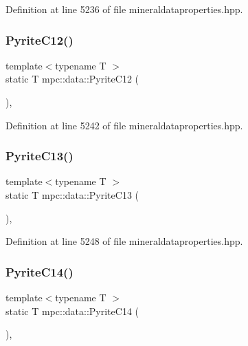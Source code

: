 Definition at line 5236 of file mineraldataproperties.\+hpp.

\mbox{\label{namespacempc_1_1data_aade0b397c9aac7f443182fa1fcf7a081}} 
\subsubsection{\texorpdfstring{Pyrite\+C12()}{PyriteC12()}}
{\footnotesize\ttfamily template$<$typename T $>$ \\
static T mpc\+::data\+::\+Pyrite\+C12 (\begin{DoxyParamCaption}{ }\end{DoxyParamCaption})\hspace{0.3cm}{\ttfamily [inline]}, {\ttfamily [static]}}



Definition at line 5242 of file mineraldataproperties.\+hpp.

\mbox{\label{namespacempc_1_1data_add506a3d279a43e1163ae3dbb77a40f4}} 
\subsubsection{\texorpdfstring{Pyrite\+C13()}{PyriteC13()}}
{\footnotesize\ttfamily template$<$typename T $>$ \\
static T mpc\+::data\+::\+Pyrite\+C13 (\begin{DoxyParamCaption}{ }\end{DoxyParamCaption})\hspace{0.3cm}{\ttfamily [inline]}, {\ttfamily [static]}}



Definition at line 5248 of file mineraldataproperties.\+hpp.

\mbox{\label{namespacempc_1_1data_ae1f4efdc925b130db38870089452d37e}} 
\subsubsection{\texorpdfstring{Pyrite\+C14()}{PyriteC14()}}
{\footnotesize\ttfamily template$<$typename T $>$ \\
static T mpc\+::data\+::\+Pyrite\+C14 (\begin{DoxyParamCaption}{ }\end{DoxyParamCaption})\hspace{0.3cm}{\ttfamily [inline]}, {\ttfamily [static]}}




